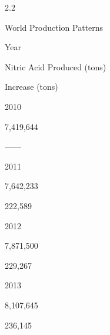 \documentclass[a4paper,portrait,12pt]{article}
\begin{document}
2.2





\begin{flushleft}
World Production Patterns
\end{flushleft}


\begin{flushleft}
Year
\end{flushleft}





\begin{flushleft}
Nitric Acid Produced (tons)
\end{flushleft}





\begin{flushleft}
Increase (tons)
\end{flushleft}





2010





7,419,644





------





2011





7,642,233





222,589





2012





7,871,500





229,267





2013





8,107,645





236,145
\end{document}
